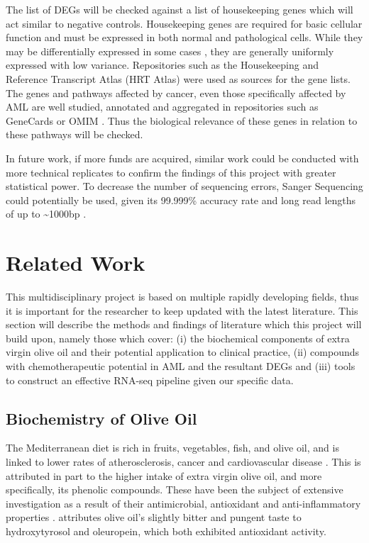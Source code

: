 The list of \ac{DEG}s will be checked against a list of housekeeping genes which will act similar to negative controls. Housekeeping genes are required for basic cellular function and must be expressed in both normal and pathological cells. While they may be differentially expressed in some cases \citep{greer2010housekeeping}, they are generally uniformly expressed with low variance. Repositories such as the Housekeeping and Reference Transcript Atlas (HRT Atlas) \citep{hounkpe2021hrt} were used as sources for the gene lists. %
The genes and pathways affected by cancer, even those specifically affected by \ac{AML} are well studied, annotated and aggregated in repositories such as GeneCards \citep{stelzer2016genecards} or OMIM \citep{hamosh2005online}. Thus the biological relevance of these genes in relation to these pathways will be checked.

In future work, if more funds are acquired, similar work could be conducted with more technical replicates to confirm the findings of this project with greater statistical power. To decrease the number of sequencing errors, Sanger Sequencing could potentially be used, given its 99.999\% accuracy rate and long read lengths of up to \textasciitilde 1000bp \citep{shendure2008next}.

\clearpage
\section{Related Work}
This multidisciplinary project is based on multiple rapidly developing fields, thus it is important for the researcher to keep updated with the latest literature. This section will describe the methods and findings of literature which this project will build upon, namely those which cover: (i) the biochemical components of extra virgin olive oil and their potential application to clinical practice, (ii) compounds with chemotherapeutic potential in \ac{AML} and the resultant \ac{DEG}s and (iii) tools to construct an effective RNA-seq pipeline given our specific data.

\subsection{Biochemistry of Olive Oil}
The Mediterranean diet is rich in fruits, vegetables, fish, and olive oil, and is linked to lower rates of atherosclerosis, cancer and cardiovascular disease \citep{owen2000, tripoli2005phenolic, cicerale2012antimicrobial, fabiani2002cancer}. This is attributed in part to the higher intake of extra virgin olive oil, and more specifically, its phenolic compounds. These have been the subject of extensive investigation as a result of their antimicrobial, antioxidant and anti-inflammatory properties \citep{cicerale2012antimicrobial, tripoli2005phenolic, bendini2007phenolic, serreli2018biological}. \cite{tripoli2005phenolic} attributes olive oil's slightly bitter and pungent taste to hydroxytyrosol and oleuropein, which both exhibited antioxidant activity.

